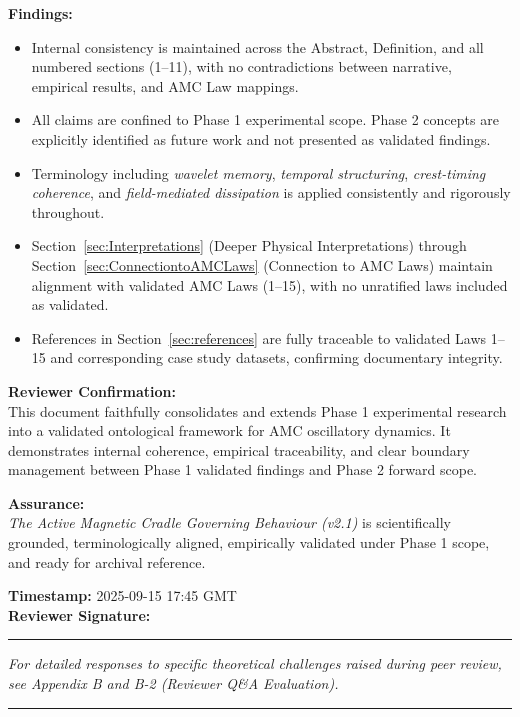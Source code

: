 \documentclass[10pt,aps,pre,onecolumn,superscriptaddress,notitlepage]{revtex4-2}
\begin{document}
\vspace{1em}
\textbf{Findings:}
\begin{itemize}[leftmargin=1.5em]
  \item Internal consistency is maintained across the Abstract, Definition, and all numbered sections (1–11), with no contradictions between narrative, empirical results, and AMC Law mappings.
  \item All claims are confined to Phase 1 experimental scope. Phase 2 concepts are explicitly identified as future work and not presented as validated findings.
  \item Terminology including \textit{wavelet memory}, \textit{temporal structuring}, \textit{crest-timing coherence}, and \textit{field-mediated dissipation} is applied consistently and rigorously throughout.
  \item Section~\ref{sec:Interpretations} (Deeper Physical Interpretations) through Section~\ref{sec:ConnectiontoAMCLaws} (Connection to AMC Laws) maintain alignment with validated AMC Laws (1–15), with no unratified laws included as validated.
  \item References in Section~\ref{sec:references} are fully traceable to validated Laws 1–15 and corresponding case study datasets, confirming documentary integrity.
\end{itemize}

\vspace{1em}
\textbf{Reviewer Confirmation:} \\
This document faithfully consolidates and extends Phase 1 experimental research into a validated ontological framework for AMC oscillatory dynamics. It demonstrates internal coherence, empirical traceability, and clear boundary management between Phase 1 validated findings and Phase 2 forward scope.

\vspace{1em}
\textbf{Assurance:} \\
\textit{The Active Magnetic Cradle Governing Behaviour (v2.1)} is scientifically grounded, terminologically aligned, empirically validated under Phase 1 scope, and ready for archival reference.

\vspace{1em}
\textbf{Timestamp:} 2025-09-15 17:45 GMT \\
\textbf{Reviewer Signature:} \rule{7cm}{0.4pt}

\vspace{1em}
\textit{For detailed responses to specific theoretical challenges raised during peer review, see Appendix B and B-2 (Reviewer Q\&A Evaluation).}

\vspace{1em}
\hrule
\end{document}
